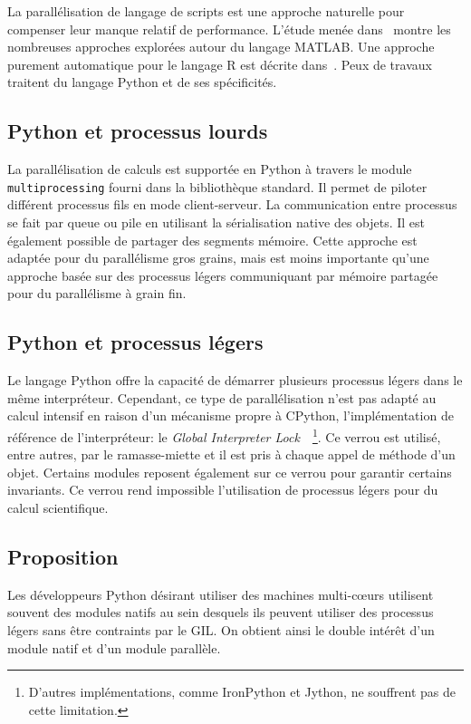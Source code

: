 \documentclass[renpar]{compas2013}
\begin{document}
La parallélisation de langage de scripts est une approche naturelle pour
compenser leur manque relatif de performance. L'étude menée
dans~\cite{choy05} montre les nombreuses approches explorées autour du
langage MATLAB. Une approche purement automatique pour le langage R est
décrite dans~\cite{mals07}. Peux de travaux traitent du langage Python et
de ses spécificités.

\subsection{Python et processus lourds}

La parallélisation de calculs est supportée en Python à travers le module
\texttt{multiprocessing} fourni dans la bibliothèque standard.  Il permet
de piloter différent processus fils en mode client-serveur. La
communication entre processus se fait par queue ou pile en utilisant la
sérialisation native des objets. Il est également possible de partager des
segments mémoire. Cette approche est adaptée pour du parallélisme gros
grains, mais est moins importante qu'une approche basée sur des processus
légers communiquant par mémoire partagée pour du parallélisme à grain fin.

\subsection{Python et processus légers}

Le langage Python offre la capacité de démarrer plusieurs processus légers
dans le même interpréteur. Cependant, ce type de parallélisation n'est pas
adapté au calcul intensif en raison d'un mécanisme propre à CPython,
l'implémentation de référence de l'interpréteur: le \emph{Global
Interpreter Lock}~\cite{gil2012}~\footnote{D'autres implémentations, comme
IronPython et Jython, ne souffrent pas de cette limitation.}. Ce verrou
est utilisé, entre autres, par le ramasse-miette et il est pris à chaque
appel de méthode d'un objet.  Certains modules reposent également sur ce
verrou pour garantir certains invariants. Ce verrou rend impossible
l'utilisation de processus légers pour du calcul scientifique.

\subsection{Proposition}

Les développeurs Python désirant utiliser des machines multi-cœurs
utilisent souvent des modules natifs au sein desquels ils peuvent utiliser
des processus légers sans être contraints par le GIL. On obtient ainsi le
double intérêt d'un module natif et d'un module parallèle.
\end{document}

